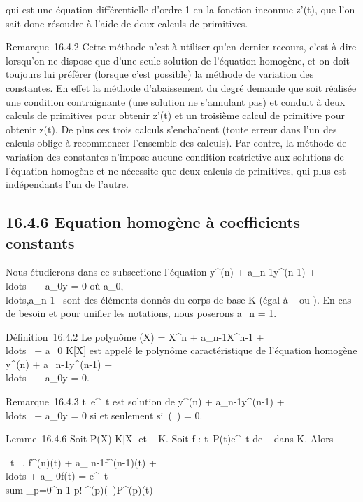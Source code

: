 \documentclass[]{article}
\begin{document}
qui est une équation différentielle d'ordre 1 en la fonction inconnue
z'(t), que l'on sait donc résoudre à l'aide de deux calculs de
primitives.

Remarque~16.4.2 Cette méthode n'est à utiliser qu'en dernier recours,
c'est-à-dire lorsqu'on ne dispose que d'une seule solution de l'équation
homogène, et on doit toujours lui préférer (lorsque c'est possible) la
méthode de variation des constantes. En effet la méthode d'abaissement
du degré demande que soit réalisée une condition contraignante (une
solution ne s'annulant pas) et conduit à deux calculs de primitives pour
obtenir z'(t) et un troisième calcul de primitive pour obtenir z(t). De
plus ces trois calculs s'enchaînent (toute erreur dans l'un des calculs
oblige à recommencer l'ensemble des calculs). Par contre, la méthode de
variation des constantes n'impose aucune condition restrictive aux
solutions de l'équation homogène et ne nécessite que deux calculs de
primitives, qui plus est indépendants l'un de l'autre.

\subsection{16.4.6 Equation homogène à coefficients constants}

Nous étudierons dans ce subsectione l'équation y^(n) +
a_n-1y^(n-1) +
\\ldots~ +
a_0y = 0 où
a_0,\\ldots,a_n-1~
sont des éléments donnés du corps de base K (égal à ~ ou ). En cas de
besoin et pour unifier les notations, nous poserons a_n = 1.

Définition~16.4.2 Le polynôme \chi(X) = X^n +
a_n-1X^n-1 +
\\ldots~ +
a_0 \in K[X] est appelé le polynôme caractéristique de
l'équation homogène y^(n) + a_n-1y^(n-1)
+ \\ldots~ +
a_0y = 0.

Remarque~16.4.3 t\mapsto~e^\lambda~t est
solution de y^(n) + a_n-1y^(n-1) +
\\ldots~ +
a_0y = 0 si et seulement si~\chi(\lambda~) = 0.

Lemme~16.4.6 Soit P(X) \in K[X] et \lambda~ \in K. Soit f :
t\mapsto~P(t)e^\lambda~t de ~ dans K. Alors

\forall~t \in {}~, f^(n)(t) + a_
n-1f^(n-1)(t) +
\\ldots + a_
0f(t) = e^\lambda~t \\sum
_p=0^n 1 \over p!
\chi^(p)(\lambda~)P^(p)(t)
\end{document}
